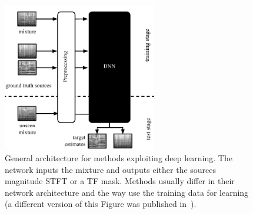 \begin{figure}
  \centering
  \includegraphics[width=0.6\textwidth]{Chapters/06_Separation_Unknown/figures/methods_dnn.pdf}
  \caption{General architecture for methods exploiting deep learning. The network inputs the mixture and outputs either the sources magnitude STFT or a TF mask. Methods usually differ in their network architecture and the way use the training data for learning (a different version of this Figure was published in~\cite{rafii}).}
  \label{fig:methods_dnn}
\end{figure}

